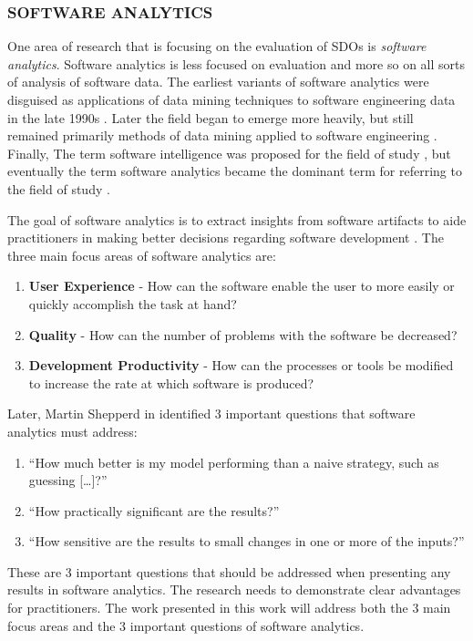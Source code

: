 \documentclass[SDSUThesis.tex]{subfiles}
\begin{document}
\subsubsection{SOFTWARE ANALYTICS}
\label{subsub:softwareanalytics}

    One area of research that is focusing on the evaluation 
    of SDOs
    is \textit{software analytics}. 
    Software analytics is less focused on evaluation
    and more so on all sorts of analysis of software data.
    The earliest variants
    of software analytics were disguised as
    applications of data mining techniques to software 
    engineering data in the 
    late 1990s \cite{Ruhe1997,Ebert1999,Goel1997}.   
    Later the field began to emerge more heavily, but still
    remained primarily methods of data mining applied to 
    software engineering \cite{Kaner2004,Xie2009,Taylor2010,Halkidi2011}. 
    Finally, The term software intelligence was proposed for the field of study
    \cite{Hassan2010}, but eventually
    the term software analytics became the dominant term for referring to the 
    field of study \cite{Buse2010, Zhang2011}.
    
    The goal of software analytics is to extract insights
    from software artifacts to aide practitioners in making 
    better decisions regarding software
    development \cite{Zhang2013}.  The three main focus areas of 
    software analytics are:
    \begin{enumerate}
        \item \textbf{User Experience} - How can the software enable the 
            user to more easily or quickly 
            accomplish the task at hand?
        \item \textbf{Quality} - How can the number of problems with 
            the software be decreased?
        \item \textbf{Development Productivity} - How can the processes
            or tools be modified to increase 
            the rate at which software is produced? 
    \end{enumerate}

    Later, Martin Shepperd in \cite{Hassan2013} identified 3 important questions that software
    analytics must address:
    \begin{enumerate}
        \item ``How much better is my model performing than 
            a naive strategy, such as guessing [\ldots]?''
        \item ``How practically significant are the results?''
        \item ``How sensitive are the results to small changes in 
            one or more of the inputs?''
    \end{enumerate}
    These are 3 important questions that should be addressed 
    when presenting any results in software analytics.  The research
    needs to demonstrate clear advantages for practitioners.  The work
    presented in this work will address both the 3 main focus areas and
    the 3 important questions of software analytics.
\end{document}
